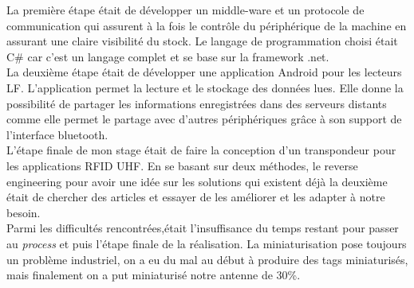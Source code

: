\documentclass[11pt, a4paper, twoside]{book}
\begin{document}
La première étape était de développer un middle-ware et un protocole de communication qui assurent à la fois le contrôle du périphérique de la machine en assurant une claire visibilité du stock. Le langage de programmation choisi était C\# car c'est un langage complet et se base sur la framework .net.\\

La deuxième étape était de développer une application Android pour les lecteurs LF. L'application permet la lecture et le stockage des données lues. Elle donne la possibilité de partager les informations enregistrées dans des serveurs distants comme elle permet le partage avec d'autres périphériques grâce à son support de l'interface bluetooth.\\


L'étape finale  de mon stage était de faire la conception d'un transpondeur pour les applications RFID UHF. En se basant sur deux méthodes, le reverse engineering pour avoir une idée sur les solutions qui existent déjà  la deuxième était de chercher des articles et essayer de les améliorer et les adapter à notre besoin.\\

Parmi les difficultés rencontrées,était l'insuffisance du temps restant pour passer  au \emph{process} et puis l'étape finale de la réalisation. La miniaturisation pose toujours un problème industriel, on a eu du mal au début à produire des tags miniaturisés, mais finalement on  a put miniaturisé notre antenne de 30\%.\\
\end{document}
